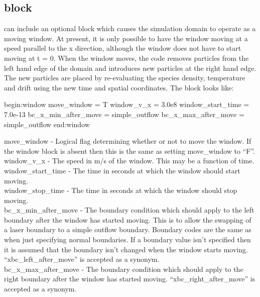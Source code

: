 \subsection{ block}
\label{sec:window_block}
{\EPOCH} can include an optional block which causes the simulation domain to
operate as a moving window. At present, it is only possible to have the window
moving at a speed parallel to the x direction, although the window
does not have to start moving at t = 0. When the window moves, the code removes
particles from the left hand edge of the domain and introduces new particles
at the right hand edge. The new particles are placed by re-evaluating the
species density, temperature and drift using the new time and spatial
coordinates. The block looks like:
\begin{boxverbatim}
begin:window
   move_window = T
   window_v_x = 3.0e8
   window_start_time = 7.0e-13
   bc_x_min_after_move = simple_outflow
   bc_x_max_after_move = simple_outflow
end:window
\end{boxverbatim}

{\emphtext move\_window} - Logical flag determining whether or not to move the
  window. If the window block is absent then this is the same as setting
  move\_window to ``F''.\\

{\emphtext window\_v\_x} - The speed in m/s of the window. This may be a
  function of time.\\

{\emphtext window\_start\_time} - The time in seconds at which the window should
  start moving.\\

{\emphtext window\_stop\_time} - The time in seconds at which the window should
  stop moving.\\

{\emphtext bc\_x\_min\_after\_move} - The boundary condition which should apply
  to the left boundary after the window has started moving. This is to allow
  the swapping of a laser boundary to a simple outflow boundary. Boundary codes
  are the same as when just specifying normal boundaries. If a boundary value
  isn't specified then it is assumed that the boundary isn't changed when the
  window starts moving. ``xbc\_left\_after\_move'' is accepted as a synonym.\\

{\emphtext bc\_x\_max\_after\_move} - The boundary condition which should apply
  to the right boundary after the window has started moving.
  ``xbc\_right\_after\_move'' is accepted as a synonym.\\

